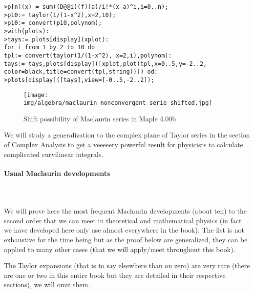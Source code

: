 	\texttt{>p[n](x) = sum((D@@i)(f)(a)/i!*(x-a)\string^i,i=0..n);\\
	>p10:= taylor(1/(1-x\string^2),x=2,10);\\
	>p10:= convert(p10,polynom);\\
	>with(plots):\\
	>tays:= plots[display](xplot):\\
	for i from 1 by 2 to 10 do\\
	tpl:= convert(taylor(1/(1-x\string^2), x=2,i),polynom):\\
	tays:= tays,plots[display]([xplot,plot(tpl,x=0..5,y=-2..2,\\
	color=black,title=convert(tpl,string))]) od: \\
	>plots[display]([tays],view=[-0..5,-2..2]);}
	
	\begin{figure}[H]
		\centering
		\texttt{[image: img/algebra/maclaurin\_nonconvergent\_serie\_shifted.jpg]}
		\caption{Shift possibility of Maclaurin series in Maple 4.00b}
	\end{figure}
	
	We will study a generalization to the complex plane of Taylor series in the section of Complex Analysis to get a veeeeery powerful result for physicists to calculate complicated curvilinear integrals.
	
	\pagebreak
	\paragraph{Usual Maclaurin developments}\label{usual maclaurin developments}\mbox{}\\\\
	We will prove here the most frequent Maclaurin developments (about ten) to the second order that we can meet in theoretical and mathematical physics (in fact we have developed here only use almost everywhere in the book). The list is not exhaustive for the time being but as the proof below are generalized, they can be applied to many other cases (that we will apply/meet throughout this book).
	
	\begin{tcolorbox}[title=Remark,colframe=black,arc=10pt]
	The Taylor expansions (that is to say elsewhere than on zero) are very rare (there are one or two in this entire book but they are detailed in their respective sections), we will omit them.
	\end{tcolorbox}
	
